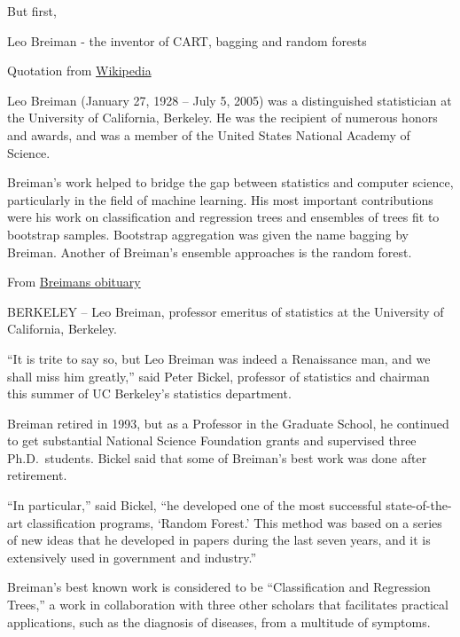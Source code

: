 \documentclass[ignorenonframetext,]{beamer}
\begin{document}
\begin{frame}

But first,

\begin{block}{Leo Breiman - the inventor of CART, bagging and random
forests}

Quotation from
\href{https://en.wikipedia.org/wiki/Leo_Breiman}{Wikipedia}

Leo Breiman (January 27, 1928 -- July 5, 2005) was a distinguished
statistician at the University of California, Berkeley. He was the
recipient of numerous honors and awards, and was a member of the United
States National Academy of Science.

Breiman's work helped to bridge the gap between statistics and computer
science, particularly in the field of machine learning. His most
important contributions were his work on classification and regression
trees and ensembles of trees fit to bootstrap samples. Bootstrap
aggregation was given the name bagging by Breiman. Another of Breiman's
ensemble approaches is the random forest.

\end{block}

\end{frame}

\begin{frame}

From
\href{https://www.berkeley.edu/news/media/releases/2005/07/07_breiman.shtml}{Breimans
obituary}

BERKELEY -- Leo Breiman, professor emeritus of statistics at the
University of California, Berkeley.

``It is trite to say so, but Leo Breiman was indeed a Renaissance man,
and we shall miss him greatly,'' said Peter Bickel, professor of
statistics and chairman this summer of UC Berkeley's statistics
department.

Breiman retired in 1993, but as a Professor in the Graduate School, he
continued to get substantial National Science Foundation grants and
supervised three Ph.D.~students. Bickel said that some of Breiman's best
work was done after retirement.

\end{frame}

\begin{frame}

``In particular,'' said Bickel, ``he developed one of the most
successful state-of-the-art classification programs, `Random Forest.'
This method was based on a series of new ideas that he developed in
papers during the last seven years, and it is extensively used in
government and industry.''

Breiman's best known work is considered to be ``Classification and
Regression Trees,'' a work in collaboration with three other scholars
that facilitates practical applications, such as the diagnosis of
diseases, from a multitude of symptoms.

\end{frame}
\end{document}
